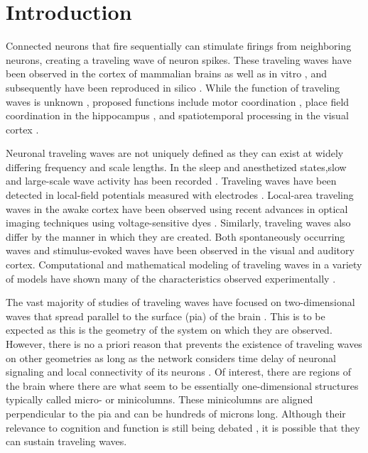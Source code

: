 \documentclass[12pt]{article}
\begin{document}
\section{Introduction} 
Connected neurons that fire sequentially can stimulate firings from neighboring neurons, creating a traveling wave of neuron spikes. 
These traveling waves have been observed in the cortex of mammalian brains \parencite{Muller2018}\parencite{reimer2010}  as well as in vitro \parencite{wu2008}\parencite{huang2004}\parencite{Colomb1999}, and subsequently have been reproduced in silico \parencite{keane2015}\parencite{Senk2018}\parencite{Golomb1996}\parencite{ermentrout2001}. 
While the function of traveling waves is unknown \parencite{wu2008}\parencite{Muller2018}, proposed functions include motor coordination \parencite{Rubino2006}, place field coordination in the hippocampus \parencite{lubernov2009}, and spatiotemporal processing in the visual cortex \parencite{wu2008}\parencite{Muller2014}.


Neuronal traveling waves are not uniquely defined as they can exist at widely differing frequency and scale lengths.  
In the sleep and anesthetized states,slow and large-scale wave activity has been recorded \parencite{Muller2018}. 
Traveling waves have been detected in local-field potentials measured with electrodes \cite{Rubino2006}\parencite{sanes1993}.
Local-area traveling waves in the awake cortex have been observed using recent advances in optical imaging techniques using voltage-sensitive dyes \parencite{wu2008}\parencite{Shoham1999}\parencite{Xu2007}.  
Similarly, traveling waves also differ by the manner in which they are created. 
Both spontaneously occurring waves and stimulus-evoked \parencite{reimer2010} waves have been observed in the visual and auditory cortex. 
Computational and mathematical modeling of traveling waves in a variety of models have shown many of the characteristics observed experimentally \parencite{ermentrout2001}\parencite{keane2015}\parencite{gibson2009}.

The vast majority of studies of traveling waves have focused on two-dimensional waves that spread parallel to the surface (pia) of the brain \parencite{Wilson1973}\parencite{reimer2010}\parencite{keane2015}\cite{Townsend2018}\parencite{Golomb1997}. 
This is to be expected as this is the geometry of the system on which they are observed. 
However, there is no a priori reason that prevents the existence of traveling waves on other geometries as long as the network considers time delay of neuronal signaling and local connectivity of its neurons \parencite{ermentrout2001}\parencite{Senk2018}. 
Of interest, there are regions of the brain where there are what seem to be essentially one-dimensional structures \parencite{buxhoeveden2002}\parencite{mountcastle1997} typically called micro- or minicolumns. 
These minicolumns are aligned perpendicular to the pia and can be hundreds of microns long.  
Although their relevance to cognition and function is still being debated \parencite{horton2005}\parencite{Cruz2009}\parencite{DaCosta2010}\parencite{buxhoeveden2002}, it is possible that they can sustain traveling waves.
\end{document}
